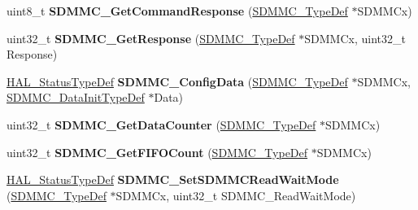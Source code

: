 \begin{DoxyCompactItemize}
\item 
\mbox{\label{group___h_a_l___s_d_m_m_c___l_l___group3_ga24ec5a3cf02412a34a54c2f9552b38b8}} 
uint8\+\_\+t {\bfseries S\+D\+M\+M\+C\+\_\+\+Get\+Command\+Response} (\mbox{\hyperlink{struct_s_d_m_m_c___type_def}{S\+D\+M\+M\+C\+\_\+\+Type\+Def}} $\ast$S\+D\+M\+M\+Cx)
\item 
\mbox{\label{group___h_a_l___s_d_m_m_c___l_l___group3_ga12ce4adfb9945f66a88775cd01b1ce1f}} 
uint32\+\_\+t {\bfseries S\+D\+M\+M\+C\+\_\+\+Get\+Response} (\mbox{\hyperlink{struct_s_d_m_m_c___type_def}{S\+D\+M\+M\+C\+\_\+\+Type\+Def}} $\ast$S\+D\+M\+M\+Cx, uint32\+\_\+t Response)
\item 
\mbox{\label{group___h_a_l___s_d_m_m_c___l_l___group3_ga2b21033b143c13d1000e9086a43944d0}} 
\mbox{\hyperlink{stm32f7xx__hal__def_8h_a63c0679d1cb8b8c684fbb0632743478f}{H\+A\+L\+\_\+\+Status\+Type\+Def}} {\bfseries S\+D\+M\+M\+C\+\_\+\+Config\+Data} (\mbox{\hyperlink{struct_s_d_m_m_c___type_def}{S\+D\+M\+M\+C\+\_\+\+Type\+Def}} $\ast$S\+D\+M\+M\+Cx, \mbox{\hyperlink{struct_s_d_m_m_c___data_init_type_def}{S\+D\+M\+M\+C\+\_\+\+Data\+Init\+Type\+Def}} $\ast$Data)
\item 
\mbox{\label{group___h_a_l___s_d_m_m_c___l_l___group3_gae4545dbbb8ff5f18d0e7bb91f95230d9}} 
uint32\+\_\+t {\bfseries S\+D\+M\+M\+C\+\_\+\+Get\+Data\+Counter} (\mbox{\hyperlink{struct_s_d_m_m_c___type_def}{S\+D\+M\+M\+C\+\_\+\+Type\+Def}} $\ast$S\+D\+M\+M\+Cx)
\item 
\mbox{\label{group___h_a_l___s_d_m_m_c___l_l___group3_ga27b9b6af9528f2e15964ff84d6e46326}} 
uint32\+\_\+t {\bfseries S\+D\+M\+M\+C\+\_\+\+Get\+F\+I\+F\+O\+Count} (\mbox{\hyperlink{struct_s_d_m_m_c___type_def}{S\+D\+M\+M\+C\+\_\+\+Type\+Def}} $\ast$S\+D\+M\+M\+Cx)
\item 
\mbox{\label{group___h_a_l___s_d_m_m_c___l_l___group3_ga31118d4136c5a509c8b8631b3c6f36bd}} 
\mbox{\hyperlink{stm32f7xx__hal__def_8h_a63c0679d1cb8b8c684fbb0632743478f}{H\+A\+L\+\_\+\+Status\+Type\+Def}} {\bfseries S\+D\+M\+M\+C\+\_\+\+Set\+S\+D\+M\+M\+C\+Read\+Wait\+Mode} (\mbox{\hyperlink{struct_s_d_m_m_c___type_def}{S\+D\+M\+M\+C\+\_\+\+Type\+Def}} $\ast$S\+D\+M\+M\+Cx, uint32\+\_\+t S\+D\+M\+M\+C\+\_\+\+Read\+Wait\+Mode)

\end{DoxyCompactItemize}
